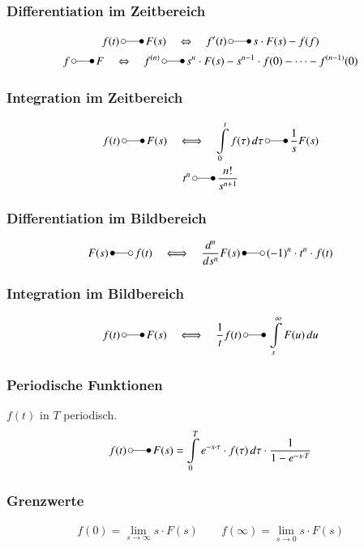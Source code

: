 \subsubsection{Differentiation im Zeitbereich}
\begin{gather}
	f(t) \,\laplace\, F(s)\quad\Leftrightarrow\quad f'(t) \,\laplace\, s\cdot F(s)-f(f) \\
	f \,\laplace\, F \quad\Leftrightarrow\quad f^{(n)} \,\laplace\, s^n\cdot F(s)-s^{n-1}\cdot f(0)
		- \cdots - f^{(n-1)}(0)
\end{gather}

\subsubsection{Integration im Zeitbereich}
\begin{gather}
	f(t) \,\laplace\, F(s)\quad\Longleftrightarrow\quad\int\limits_0^t f(\tau)\,d\tau \,\laplace\, \frac{1}{s}F(s) \\
	t^n \,\laplace\, \frac{n!}{s^{n+1}}
\end{gather}

\subsubsection{Differentiation im Bildbereich}
\begin{equation}
	F(s) \,\Laplace\, f(t)\quad\Longleftrightarrow\quad\frac{d^n}{ds^n}F(s) \,\Laplace\, (-1)^n\cdot t^n\cdot f(t)
\end{equation}

\subsubsection{Integration im Bildbereich}
\begin{equation}
	f(t) \,\laplace\, F(s)\quad\Longleftrightarrow\quad\frac{1}{t}f(t) \,\laplace\, \int\limits_s^\infty F(u)\,du
\end{equation}

\subsubsection{Periodische Funktionen}
$f(t)$ in $T$ periodisch.
\begin{equation}
	f(t) \,\laplace\, F(s) = \int\limits_0^T e^{-s\cdot\tau}\cdot f(\tau)\,d\tau \cdot\frac{1}{1-e^{-s\cdot T}}
\end{equation}

\subsubsection{Grenzwerte}
\begin{gather}
	f(0)=\lim_{s\to\infty} s\cdot F(s) \qquad f(\infty)=\lim_{s\to 0} s\cdot F(s)
\end{gather}

